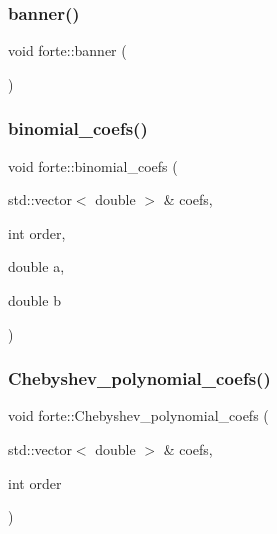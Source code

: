 \subsubsection{\texorpdfstring{banner()}{banner()}}
{\footnotesize\ttfamily void forte\+::banner (\begin{DoxyParamCaption}{ }\end{DoxyParamCaption})}

\mbox{\label{namespaceforte_afa0eca959585b5f22950ec78545c776a}} 
\subsubsection{\texorpdfstring{binomial\+\_\+coefs()}{binomial\_coefs()}}
{\footnotesize\ttfamily void forte\+::binomial\+\_\+coefs (\begin{DoxyParamCaption}\item[{std\+::vector$<$ double $>$ \&}]{coefs,  }\item[{int}]{order,  }\item[{double}]{a,  }\item[{double}]{b }\end{DoxyParamCaption})}

\mbox{\label{namespaceforte_a49951e085a0ae4293cca543bd045a7ec}} 
\subsubsection{\texorpdfstring{Chebyshev\+\_\+polynomial\+\_\+coefs()}{Chebyshev\_polynomial\_coefs()}}
{\footnotesize\ttfamily void forte\+::\+Chebyshev\+\_\+polynomial\+\_\+coefs (\begin{DoxyParamCaption}\item[{std\+::vector$<$ double $>$ \&}]{coefs,  }\item[{int}]{order }\end{DoxyParamCaption})}

\mbox{\label{namespaceforte_ac876390be637f4d5b66bdee731dbce66}} 
